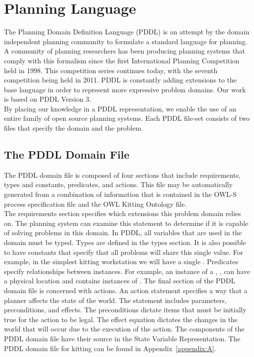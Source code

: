 
\section{Planning Language}\label{S:PDDL}
The Planning Domain Definition Language (PDDL) \cite{PDDL} is an attempt by the domain independent planning community to formulate a standard language for planning. A community
of planning researchers has been producing planning systems that comply with this formalism since the first International Planning Competition held in 1998. This competition series
continues today, with the seventh competition being held in 2011. PDDL is constantly adding extensions to the base language in order to represent more expressive problem domains. Our work is based on PDDL Version 3.\\

\noindent
By placing our knowledge in a PDDL representation, we enable the use of an entire family of open source planning systems.
Each PDDL file-set consists of two files that specify the domain and the problem.

\subsection{The PDDL Domain File}\label{S:PDDL-domain}
The PDDL domain file is composed of four sections that include
requirements, types and constants, predicates, and actions. This file may be automatically generated from a combination of information that is contained in the OWL-S process specification file and the OWL Kitting Ontology file.\\

\noindent
The requirements section specifies which extensions this problem domain relies on. The planning system can examine this statement to determine if it is capable of solving problems in this domain. In PDDL, all variables that are used in the domain must be typed. Types are defined in the $\mathrm{types}$ section. It is also possible to have constants that specify that all problems will share this single value. For example, in the simplest kitting workstation we will have a single  .
Predicates specify relationships between instances. For example, an instance of a , , can have a physical location and contains instances of . The final section of the PDDL domain file is concerned with actions. An action statement specifies a way that a planner affects the state of the world. The statement includes parameters, preconditions, and effects. The preconditions dictate items that must be initially true for the action to be legal. The effect equation dictates the changes in the world that will occur due to the execution of the action. The components of the PDDL domain file have their source in the State Variable Representation. The PDDL domain file for kitting can be found in Appendix~\ref{appendix:A}.




